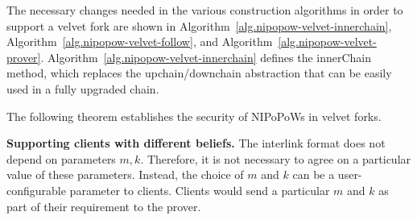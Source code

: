 The necessary changes needed in the various construction algorithms in order to
support a velvet fork are shown in
Algorithm~\ref{alg.nipopow-velvet-innerchain},
Algorithm~\ref{alg.nipopow-velvet-follow}, and
Algorithm~\ref{alg.nipopow-velvet-prover}.
Algorithm~\ref{alg.nipopow-velvet-innerchain} defines the innerChain method,
which replaces the upchain/downchain abstraction that can be easily used in a
fully upgraded chain.

The following theorem establishes the security of NIPoPoWs in velvet forks.


\noindent\textbf{Supporting clients with different beliefs.}
The interlink format does not depend on parameters $m, k$. Therefore, it is not
necessary to agree on a particular value of these parameters. Instead, the
choice of $m$ and $k$ can be a user-configurable parameter to clients.
Clients would send a particular $m$ and $k$ as part of their requirement to
the prover.
